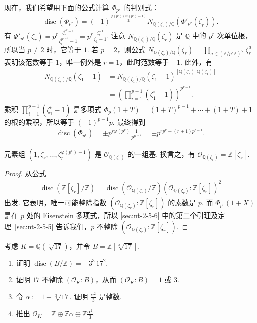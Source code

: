 现在，我们希望用下面的公式计算 $\Phi_{p^r}$ 的判别式：
\begin{align*}
\operatorname{disc}(\Phi_{p^r})
=(-1)^{\frac{\varphi(p^r)(\varphi(p^r)-1)}2}
N_{\mathbb Q(\zeta_r)/\mathbb Q}(\Phi'_{p^r}(\zeta_r)).
\end{align*}
有
$\Phi'_{p^r}(\zeta_r)=p^r\frac{\zeta_r^{p^r-1}}{\zeta_r^{p^{r-1}}-1}
=p^r\frac{\zeta_r^{-1}}{\zeta_1-1}$.
注意 $N_{\mathbb Q(\zeta_r)/\mathbb Q}(\zeta_r)$ 是 $\mathbb Q$ 中的 $p^r$ 次单位根，所以当 $p\ne2$ 时，它等于 $1$.
若 $p=2$，则公式
$N_{\mathbb Q(\zeta_r)/\mathbb Q}(\zeta_r)
=\prod_{a\in(\mathbb Z/p^r\mathbb Z)^\times}\zeta_r^a$
表明该范数等于 $1$，唯一例外是 $r=1$，此时范数等于 $-1$.
此外，有
\begin{align*}
N_{\mathbb Q(\zeta_r)/\mathbb Q}(\zeta_1-1)
&=N_{\mathbb Q(\zeta_1)/\mathbb Q}(\zeta_1-1)^{
[\mathbb Q(\zeta_r):\mathbb Q(\zeta_1)]}\\
&=\left(\prod_{i=1}^{p-1}(\zeta_1^i-1)\right)^{p^{r-1}}.
\end{align*}
乘积 $\prod_{i=1}^{p-1}(\zeta_1^i-1)$ 是多项式
$\Phi_p(1+T)=(1+T)^{p-1}+\cdots+(1+T)+1$
的根的乘积，所以等于 $(-1)^{p-1}p$.
最终得到
\begin{align*}
\operatorname{disc}(\Phi_{p^r})
=\pm p^{r\varphi(p^r)}\frac1{p^{p^{r-1}}}
=\pm p^{rp^r-(r+1)p^{r-1}}.
\end{align*}
\begin{corollary*}
元素组 $(1,\zeta_r,\ldots,\zeta_r^{\varphi(p^r)-1})$ 是 $\mathcal O_{\mathbb Q(\zeta_r)}$ 的一组基.
换言之，有 $\mathcal O_{\mathbb Q(\zeta_r)}=\mathbb Z[\zeta_r]$.
\end{corollary*}
\begin{proof}
从公式
\begin{align*}
\operatorname{disc}(\mathbb Z[\zeta_r]/\mathbb Z)
=\operatorname{disc}(\mathcal O_{\mathbb Q(\zeta_r)}/\mathbb Z)
(\mathcal O_{\mathbb Q(\zeta_r)}:\mathbb Z[\zeta_r])^2
\end{align*}
出发. 它表明，唯一可能整除指数
$(\mathcal O_{\mathbb Q(\zeta_r)}:\mathbb Z[\zeta_r])$ 的素数是 $p$.
而 $\Phi_{p^r}(1+X)$ 是在 $p$ 处的 Eisenstein 多项式，所以
\ref{sec:nt-2-5-6} 中的第二个引理及定理~\ref{sec:nt-2-5-5}
告诉我们，$p$ 不整除 $(\mathcal O_{\mathbb Q(\zeta_r)}:\mathbb Z[\zeta_r])$.
\end{proof}
\begin{exercise*}
考虑 $K=\mathbb Q(\sqrt[3]{17})$，并令 $B=\mathbb Z[\sqrt[3]{17}]$.
\begin{enumerate}[label=\roman*),nosep]
\item 证明 $\operatorname{disc}(B/\mathbb Z)=-3^3\,17^2$.
\item 证明 $17$ 不整除 $(\mathcal O_K:B)$，从而 $(\mathcal O_K:B)=1$ 或 $3$.
\item 令 $\alpha:=1+\sqrt[3]{17}$. 证明 $\frac{\alpha^2}{3}$ 是整数.
\item 推出 $\mathcal O_K=\mathbb Z\oplus\mathbb Z\alpha\oplus\mathbb Z\frac{\alpha^2}{3}$.
\end{enumerate}
\end{exercise*}
